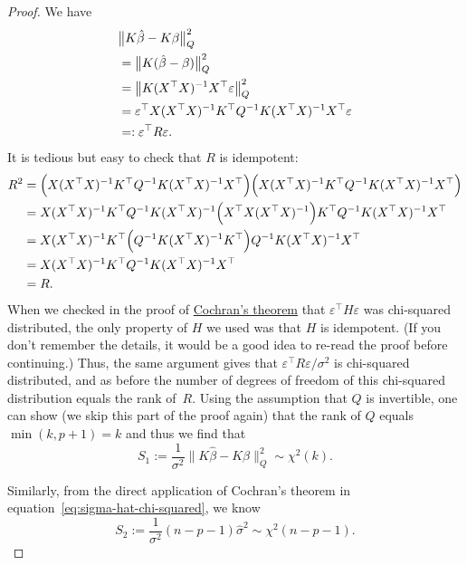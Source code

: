 \documentclass[
  a4paper,
]{article}
\theoremstyle{definition}
\theoremstyle{definition}
\theoremstyle{definition}
\theoremstyle{definition}
\theoremstyle{remark}
\begin{document}
\begin{proof}
We have
\begin{align*}
  \hskip-5mm
  & \bigl\| K \hat\beta - K \beta \bigr\|_Q^2 \\
  &= \bigl\| K (\hat\beta - \beta) \bigr\|_Q^2 \\
  &= \bigl\| K (X^\top X)^{-1} X^\top \varepsilon\bigr\|_Q^2 \\
  &= \varepsilon^\top X (X^\top X)^{-1} K^\top Q^{-1} K (X^\top X)^{-1} X^\top \varepsilon\\
  &=: \varepsilon^\top R \varepsilon.
\end{align*}
It is tedious but easy to check that \(R\) is idempotent:
\begin{align*}
  R^2
  &= \Bigl(X (X^\top X)^{-1} K^\top Q^{-1} K (X^\top X)^{-1} X^\top\Bigr)
     \Bigl(X (X^\top X)^{-1} K^\top Q^{-1} K (X^\top X)^{-1} X^\top\Bigr) \\
  &= X (X^\top X)^{-1} K^\top Q^{-1} K (X^\top X)^{-1} \Bigl(X^\top
     X (X^\top X)^{-1} \Bigr) K^\top Q^{-1} K (X^\top X)^{-1} X^\top \\
  &= X (X^\top X)^{-1} K^\top \Bigl( Q^{-1} K (X^\top X)^{-1} K^\top \Bigr)
      Q^{-1} K (X^\top X)^{-1} X^\top \\
  &= X (X^\top X)^{-1} K^\top Q^{-1} K (X^\top X)^{-1} X^\top \\
  &= R.
\end{align*}
When we checked in the proof of \protect\hyperlink{thm:Cochran}{Cochran's theorem} that
\(\varepsilon^\top H \varepsilon\) was chi-squared distributed, the only property of \(H\)
we used was that \(H\) is idempotent. (If you don't remember the details,
it would be a good idea to re-read the proof before continuing.) Thus,
the same argument gives that \(\varepsilon^\top R \varepsilon/ \sigma^2\) is chi-squared distributed,
and as before the number of degrees of freedom of this chi-squared distribution
equals the rank of~\(R\). Using the assumption that \(Q\) is invertible,
one can show (we skip this part of the proof again)
that the rank of \(Q\) equals \(\min(k, p+1) = k\) and thus we find that
\begin{equation*}
  S_1
  := \frac{1}{\sigma^2} \bigl\| K \hat\beta - K \beta \bigr\|_Q^2
  \sim \chi^2(k).
\end{equation*}

Similarly, from the direct application of Cochran's theorem in
equation~\eqref{eq:sigma-hat-chi-squared}, we know
\begin{equation*}
  S_2
  := \frac{1}{\sigma^2} (n - p - 1) \hat\sigma^2
  \sim \chi^2(n - p - 1).
\end{equation*}


\end{proof}
\end{document}
